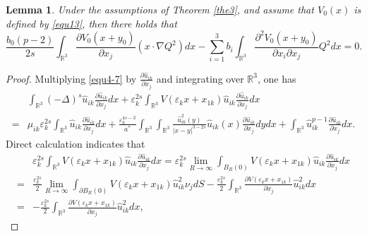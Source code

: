 \documentclass[reqno, 11pt]{amsart} %
\numberwithin{equation}{section}
\newtheorem{lemma}[theorem]{Lemma}
\begin{document}
	\begin{lemma}\label{lem4-3}
		Under the assumptions of Theorem \ref{the3}, and assume that $V_{0}(x)$ is defined by \eqref{equ13}, then there holds that
		\begin{equation}\label{equ4-23}
			\frac{b_{0}(p-2)}{2s}\int_{\mathbb{R}^{3}}\frac{\partial V_{0}(x+y_{0})}{\partial x_{j}}(x\cdot\nabla Q^{2})dx-\sum^{3}_{i=1}
			b_{i}\int_{\mathbb{R}^{3}}\frac{\partial^{2}V_{0}(x+y_{0})}{\partial x_{i}\partial x_{j}}Q^{2}dx=0.
		\end{equation}
	\end{lemma}
	\begin{proof}
		Multiplying \eqref{equ4-7} by $\frac{\partial\hat{u}_{ik}}{\partial x_{j}}$ and integrating over $\mathbb{R}^{3}$, one has
		\begin{equation}\label{equ4-24}
			\begin{split}
				&\int_{\mathbb{R}^{3}}(-\Delta)^{s} \hat{u}_{ik}\frac{\partial\hat{u}_{ik}}{\partial x_{j}}dx+\varepsilon_{k}^{2s}\int_{\mathbb{R}^{3}}V(\varepsilon_{k}x+x_{1k})\hat{u}_{ik}\frac{\partial\hat{u}_{ik}}{\partial x_{j}}dx\\
				=&\mu_{ik}\varepsilon_{k}^{2s}\int_{\mathbb{R}^{3}}\hat{u}_{ik}\frac{\partial\hat{u}_{ik}}{\partial x_{j}}dx+\frac{\varepsilon_{k}^{4s-3}}{a^{\ast}}\int_{\mathbb{R}^{3}}\int_{\mathbb{R}^{3}}\frac{\hat{u}_{ik}^{2}(y)}{|x-y|^{3-2s}}\hat{u}_{ik}(x)\frac{\partial\hat{u}_{ik}}{\partial x_{j}}dydx+\int_{\mathbb{R}^{3}}\hat{u}_{ik}^{p-1}\frac{\partial\hat{u}_{ik}}{\partial x_{j}}dx.
			\end{split}
		\end{equation}
		Direct calculation indicates that
		\begin{equation}\label{equ4-25}
			\begin{split}
				&\varepsilon_{k}^{2s}\int_{\mathbb{R}^{3}}V(\varepsilon_{k}x+x_{1k})\hat{u}_{ik}\frac{\partial\hat{u}_{ik}}{\partial x_{j}}dx=\varepsilon_{k}^{2s}\lim_{R\rightarrow\infty}\int_{ B_{R}(0)}V(\varepsilon_{k}x+x_{1k})\hat{u}_{ik}\frac{\partial\hat{u}_{ik}}{\partial x_{j}}dx\\
				=&\frac{\varepsilon_{k}^{2s}}{2}\lim_{R\rightarrow\infty}\int_{ \partial B_{R}(0)}V(\varepsilon_{k}x+x_{1k})\hat{u}_{ik}^{2}\nu_{j} dS-\frac{\varepsilon_{k}^{2s}}{2}\int_{\mathbb{R}^{3}}\frac{\partial V(\varepsilon_{k}x+x_{1k})}{\partial x_{j}}\hat{u}_{ik}^{2}dx\\
				=&-\frac{\varepsilon_{k}^{2s}}{2}\int_{\mathbb{R}^{3}}\frac{\partial V(\varepsilon_{k}x+x_{1k})}{\partial x_{j}}\hat{u}_{ik}^{2}dx,

\end{split}
\end{equation}
\end{proof}
\end{document}
